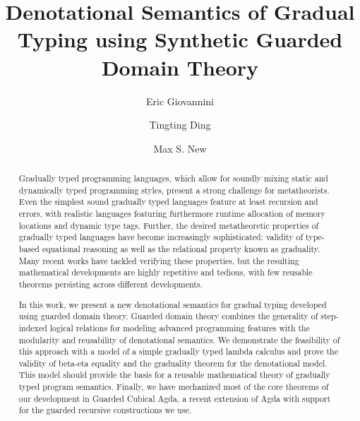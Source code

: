 \documentclass[acmsmall]{acmart}
\theoremstyle{remark}
\begin{document}
\title{Denotational Semantics of Gradual Typing using Synthetic Guarded Domain Theory}
\author{Eric Giovannini}

\author{Tingting Ding}

\author{Max S. New}

\begin{abstract}
  Gradually typed programming languages, which allow for soundly
  mixing static and dynamically typed programming styles, present a
  strong challenge for metatheorists. Even the simplest sound
  gradually typed languages feature at least recursion and errors,
  with realistic languages featuring furthermore runtime allocation of
  memory locations and dynamic type tags. Further, the desired
  metatheoretic properties of gradually typed languages have become
  increasingly sophisticated: validity of type-based equational
  reasoning as well as the relational property known as
  graduality. Many recent works have tackled verifying these
  properties, but the resulting mathematical developments are highly
  repetitive and tedious, with few reusable theorems persisting across
  different developments.

  In this work, we present a new denotational semantics for gradual
  typing developed using guarded domain theory. Guarded domain theory
  combines the generality of step-indexed logical relations for
  modeling advanced programming features with the modularity and
  reusability of denotational semantics. We demonstrate the
  feasibility of this approach with a model of a simple gradually
  typed lambda calculus and prove the validity of beta-eta equality
  and the graduality theorem for the denotational model. This model
  should provide the basis for a reusable mathematical theory of
  gradually typed program semantics. Finally, we have mechanized most
  of the core theorems of our development in Guarded Cubical Agda, a
  recent extension of Agda with support for the guarded recursive
  constructions we use.
\end{abstract}
\end{document}
